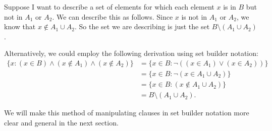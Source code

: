 \begin{example}
Suppose I want to describe a set of elements for which each element $x$ is in $B$ but not in $A_1$ or $A_2$. We can describe this as follows. Since $x$ is not in $A_1$ or $A_2$, we know that $x \not\in A_1 \cup A_2$. So the set we are describing is just the set $B \setminus (A_1 \cup A_2)$.

Alternatively, we could employ the following derivation using set builder notation:
\begin{align*}
	\{x \colon (x \in B) \land (x \not\in A_1) \land (x \not\in A_2)\} &= \{x \in B \colon \lnot((x \in A_1) \lor (x \in A_2))\} \\ 
	&= \{x \in B \colon \lnot(x \in A_1 \cup A_2)\} \\
	&= \{x \in B \colon (x \not\in A_1 \cup A_2)\} \\
	&= B \setminus (A_1 \cup A_2).
\end{align*}

We will make this method of manipulating clauses in set builder notation more clear and general in the next section.
\end{example}
